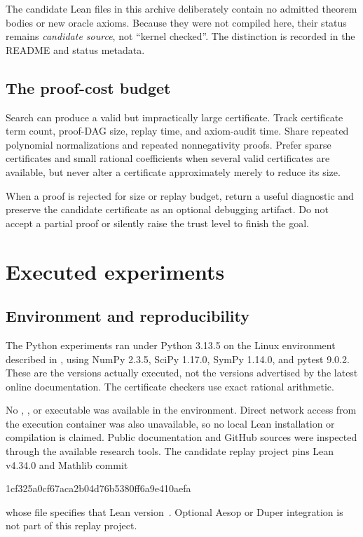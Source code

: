 The candidate Lean files in this archive deliberately contain no admitted theorem bodies or new oracle axioms. Because they were not compiled here, their status remains \emph{candidate source}, not ``kernel checked''. The distinction is recorded in the README and status metadata.

\subsection{The proof-cost budget}

Search can produce a valid but impractically large certificate. Track certificate term count, proof-DAG size, replay time, and axiom-audit time. Share repeated polynomial normalizations and repeated nonnegativity proofs. Prefer sparse certificates and small rational coefficients when several valid certificates are available, but never alter a certificate approximately merely to reduce its size.

When a proof is rejected for size or replay budget, return a useful \unknown{} diagnostic and preserve the candidate certificate as an optional debugging artifact. Do not accept a partial proof or silently raise the trust level to finish the goal.

\section{Executed experiments}

\subsection{Environment and reproducibility}

The Python experiments ran under Python 3.13.5 on the Linux environment described in , using NumPy 2.3.5, SciPy 1.17.0, SymPy 1.14.0, and pytest 9.0.2. These are the versions actually executed, not the versions advertised by the latest online documentation. The certificate checkers use exact rational arithmetic.

No , , or  executable was available in the environment. Direct network access from the execution container was also unavailable, so no local Lean installation or compilation is claimed. Public documentation and GitHub sources were inspected through the available research tools. The candidate replay project pins Lean v4.34.0 and Mathlib commit
\begin{center}\small\ttfamily
1cf325a0cf67aca2b04d76b5380ff6a9e410aefa
\end{center}
whose  file specifies that Lean version~\cite{mathlibpin}. Optional Aesop or Duper integration is not part of this replay project.

